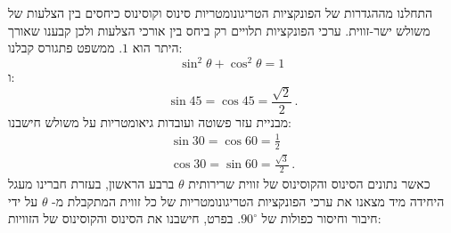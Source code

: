 \documentclass[12pt,a4paper]{article}
\begin{document}
התחלנו מההגדרות של הפונקציות הטריגונומטריות סינוס וקוסינוס כיחסים בין הצלעות של משולש ישר-זווית. ערכי הפונקציות תלויים רק ביחס בין אורכי הצלעות ולכן קבענו שאורך היתר הוא
$1$.
ממשפט פתגורס קבלנו:
\[
\sin^2 \theta + \cos^2\theta = 1\,
\]
ו:
\[
\sin 45 = \cos 45 = \frac{\sqrt{2}}{2}\,.
\]
מבניית עזר פשוטה ועובדות גיאומטריות על משולש חישבנו:
\[
\renewcommand{\arraystretch}{1.3}
\begin{array}{l}
\sin 30 = \cos 60 = \displaystyle\frac{1}{2}\\
\cos 30 = \sin 60 = \displaystyle\frac{\sqrt{3}}{2}\,.
\end{array}
\]
כאשר נתונים הסינוס והקוסינוס של זווית שרירותית 
$\theta$
ברבע הראשון, בעזרת חברינו מעגל היחידה מיד מצאנו את ערכי הפונקציות הטריגונומטריות של כל זווית המתקבלת מ-%
$\theta$
על ידי חיבור וחיסור כפולות של 
$90^\circ$.
בפרט, חישבנו את הסינוס והקוסינוס של הזוויות:
\end{document}
